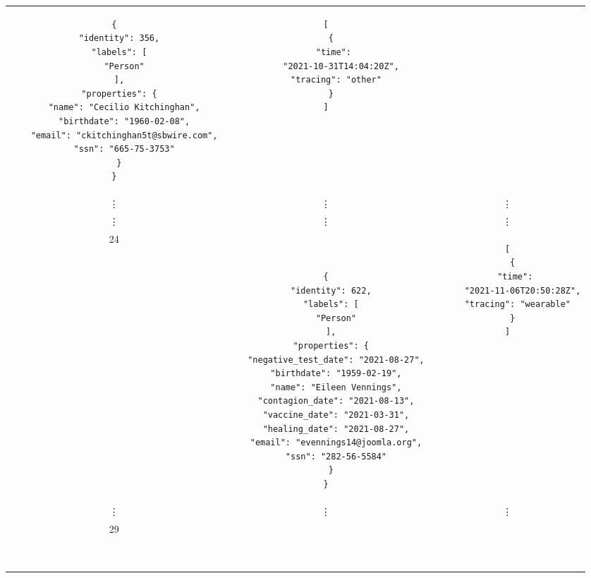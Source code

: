 \documentclass[12pt, a4paper]{article}
\begin{document}
\begin{scriptsize}
\begin{center}
\begin{longtable}{ |c|c|c| }
\begin{minipage}{7,2cm}
\begin{verbatim}
{
  "identity": 356,
  "labels": [
    "Person"
  ],
  "properties": {
    "name": "Cecilio Kitchinghan",
    "birthdate": "1960-02-08",
    "email": "ckitchinghan5t@sbwire.com",
    "ssn": "665-75-3753"
  }
}
                \end{verbatim}
            \end{minipage}
            & 
            \begin{minipage}{5cm}
                \begin{verbatim}
[
  {
    "time": 
      "2021-10-31T14:04:20Z",
    "tracing": "other"
  }
]
                \end{verbatim}
            \end{minipage} \\*
            \vdots & \vdots & \vdots \\
            \vdots & \vdots & \vdots \\*
            24 &
            \begin{minipage}{7,2cm}
                \begin{verbatim}


{
  "identity": 622,
  "labels": [
    "Person"
  ],
  "properties": {
    "negative_test_date": "2021-08-27",
    "birthdate": "1959-02-19",
    "name": "Eileen Vennings",
    "contagion_date": "2021-08-13",
    "vaccine_date": "2021-03-31",
    "healing_date": "2021-08-27",
    "email": "evennings14@joomla.org",
    "ssn": "282-56-5584"
  }
}
                \end{verbatim}
            \end{minipage}
            & 
            \begin{minipage}{5cm}
                \begin{verbatim}
[
  {
    "time": 
      "2021-11-06T20:50:28Z",
    "tracing": "wearable"
  }
]
                \end{verbatim}
            \end{minipage} \\
            \vdots & \vdots & \vdots \\
            29 &
            \begin{minipage}{7,2cm}
                \begin{verbatim}



\end{verbatim}
\end{minipage}
\end{longtable}
\end{center}
\end{scriptsize}
\end{document}
